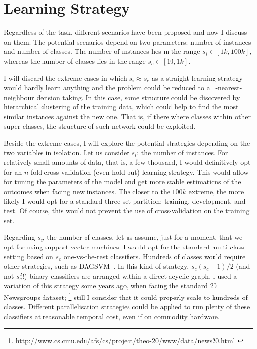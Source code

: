 \documentclass[11pt]{article}
\begin{document}
\section{Learning Strategy}
\label{sec:learning}
Regardless of the task, different scenarios have been proposed and now I discuss 
on them. The potential scenarios depend on two parameters: number of instances 
and number of classes. The number of instances lies in the range $s_i\in [1k, 
100k]$, whereas the number of classes lies in the range $s_c\in [10, 1k]$. 

I will discard the extreme cases in which $s_i\approx s_c$ as a straight 
learning strategy would hardly learn anything and the problem could be reduced 
to a $1$-nearest-neighbour decision taking. In this case, some structure could 
be discovered by hierarchical clustering of the training data, which could help 
to find the most similar instances against the new one. That is, if there 
where classes within other super-classes, the structure of such network could 
be exploited.

Beside the extreme cases, I will explore the potential strategies depending on 
the two variables in isolation. Let us consider $s_i$: the number of instances. 
For relatively small amounts of data, that is, a few thousand, I would 
definitively opt for an $n$-fold cross validation (even hold out) learning 
strategy. This would allow for tuning the 
parameters of the model and get more stable estimations of the outcomes when 
facing new instances. The closer to the $100k$ extreme, the more likely I 
would opt for a standard three-set partition: training, development, and test. 
Of course, this would not prevent the use of cross-validation on the 
training set. 

Regarding $s_c$, the number of classes, let us assume, just for a moment, that 
we opt for using support vector machines. I would opt for the standard 
multi-class setting based on $s_c$ one-vs-the-rest classifiers. Hundreds of 
classes would require other strategies, such as 
DAGSVM~\cite{large-margin-dags-for-multiclass-classification}. In this kind of 
strategy, $s_c(s_c-1)/2$ (and not $s_c^2$!) binary classifiers are arranged 
within a direct acyclic graph. I used a variation of this strategy some years 
ago, when facing the standard 20 Newsgroups dataset;%
\footnote{\url{http://www.cs.cmu.edu/afs/cs/project/theo-20/www/data/news20.html
}}
still I consider that it could properly scale to hundreds of classes. Different 
parallelisation strategies could be applied to run plenty of these classifiers 
at reasonable temporal cost, even if on commodity hardware.
\end{document}
